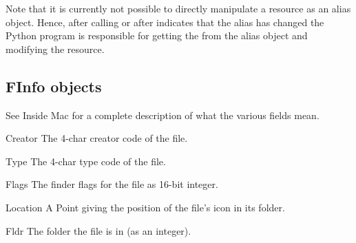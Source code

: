 Note that it is currently not possible to directly manipulate a resource
as an alias object. Hence, after calling  or after
 indicates that the alias has changed the Python program
is responsible for getting the  from the alias object and
modifying the resource.


\subsection{FInfo objects}

See Inside Mac for a complete description of what the various fields
mean.

\renewcommand{\indexsubitem}{(FInfo object attribute)}
\begin{datadesc}{Creator}
The 4-char creator code of the file.
\end{datadesc}

\begin{datadesc}{Type}
The 4-char type code of the file.
\end{datadesc}

\begin{datadesc}{Flags}
The finder flags for the file as 16-bit integer.
\end{datadesc}

\begin{datadesc}{Location}
A Point giving the position of the file's icon in its folder.
\end{datadesc}

\begin{datadesc}{Fldr}
The folder the file is in (as an integer).
\end{datadesc}
